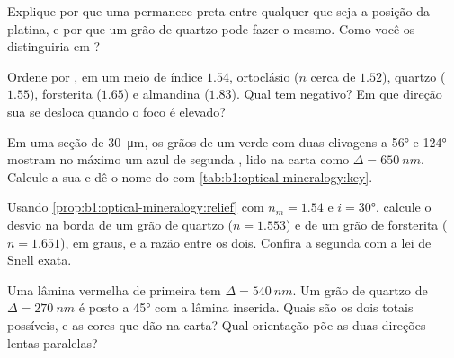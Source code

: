 \begin{exercise}[$\star$]\label{exo:b1:optical-mineralogy:3}
Explique por que uma  permanece preta entre  qualquer que seja a posição da platina, e por que um grão de quartzo pode fazer o mesmo. Como você os distinguiria em ?
\end{exercise}

\begin{exercise}[$\star$]\label{exo:b1:optical-mineralogy:4}
Ordene por , em um meio de índice $1.54$, ortoclásio ($n$ cerca de $1.52$), quartzo ($1.55$), forsterita ($1.65$) e almandina ($1.83$). Qual tem  negativo? Em que direção sua  se desloca quando o foco é elevado?
\end{exercise}

\begin{exercise}[$\star\star$]\label{exo:b1:optical-mineralogy:5}
Em uma seção de \qty{30}{\micro m}, os grãos de um  verde  com duas clivagens a \ang{56} e \ang{124} mostram no máximo um azul de segunda , lido na carta como $\Delta = \qty{650}{nm}$. Calcule a sua  e dê o nome do  com \cref{tab:b1:optical-mineralogy:key}.
\end{exercise}

\begin{exercise}[$\star\star$]\label{exo:b1:optical-mineralogy:6}
Usando \cref{prop:b1:optical-mineralogy:relief} com $n_m = 1.54$ e $i = \ang{30}$, calcule o desvio na borda de um grão de quartzo ($n = 1.553$) e de um grão de forsterita ($n = 1.651$), em graus, e a razão entre os dois. Confira a segunda com a lei de Snell exata.
\end{exercise}

\begin{exercise}[$\star\star$]\label{exo:b1:optical-mineralogy:7}
Uma lâmina vermelha de primeira  tem $\Delta = \qty{540}{nm}$. Um grão de quartzo de $\Delta = \qty{270}{nm}$ é posto a \ang{45} com a lâmina inserida. Quais são os dois  totais possíveis, e as cores que dão na carta? Qual orientação põe as duas direções lentas paralelas?
\end{exercise}

